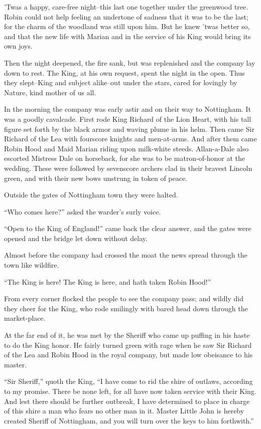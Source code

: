 'Twas a happy, care-free night--this last one together under the
greenwood tree. Robin could not help feeling an undertone of sadness
that it was to be the last; for the charm of the woodland was still upon
him. But he knew 'twas better so, and that the new life with Marian and
in the service of his King would bring its own joys.

Then the night deepened, the fire sank, but was replenished and the
company lay down to rest. The King, at his own request, spent the night
in the open. Thus they slept--King and subject alike--out under the
stars, cared for lovingly by Nature, kind mother of us all.

In the morning the company was early astir and on their way to
Nottingham. It was a goodly cavalcade. First rode King Richard of the
Lion Heart, with his tall figure set forth by the black armor and waving
plume in his helm. Then came Sir Richard of the Lea with fourscore
knights and men-at-arms. And after them came Robin Hood and Maid Marian
riding upon milk-white steeds. Allan-a-Dale also escorted Mistress Dale
on horseback, for she was to be matron-of-honor at the wedding. These
were followed by sevenscore archers clad in their bravest Lincoln green,
and with their new bows unstrung in token of peace.

Outside the gates of Nottingham town they were halted.

``Who comes here?'' asked the warder's surly voice.

``Open to the King of England!'' came back the clear answer, and the
gates were opened and the bridge let down without delay.

Almost before the company had crossed the moat the news spread through
the town like wildfire.

``The King is here! The King is here, and hath taken Robin Hood!''

From every corner flocked the people to see the company pass; and wildly
did they cheer for the King, who rode smilingly with bared head down
through the market-place.

At the far end of it, he was met by the Sheriff who came up puffing in
his haste to do the King honor. He fairly turned green with rage when he
saw Sir Richard of the Lea and Robin Hood in the royal company, but made
low obeisance to his master.

``Sir Sheriff,'' quoth the King, ``I have come to rid the shire of
outlaws, according to my promise. There be none left, for all have now
taken service with their King. And lest there should be further
outbreak, I have determined to place in charge of this shire a man who
fears no other man in it. Master Little John is hereby created Sheriff
of Nottingham, and you will turn over the keys to him forthwith.''

